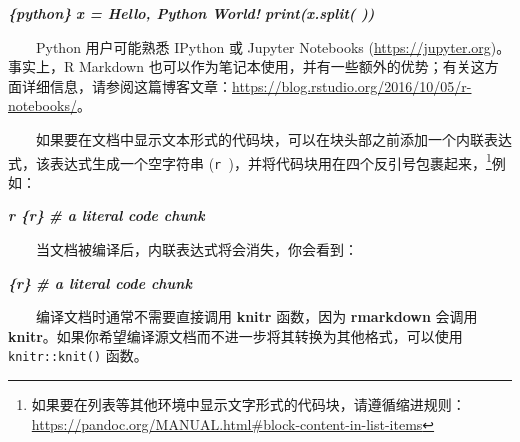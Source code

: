 \documentclass[
  12pt,
]{krantz}
\newenvironment{Shaded}{\begin{snugshade}}{\end{snugshade}}
\newcommand{\InformationTok}[1]{\textcolor[rgb]{0.56,0.35,0.01}{\textbf{\textit{#1}}}}
\theoremstyle{definition}
\theoremstyle{definition}
\theoremstyle{definition}
\theoremstyle{definition}
\theoremstyle{remark}
\begin{document}
\begin{Shaded}
\begin{Highlighting}[]
\InformationTok{\textasciigrave{}\textasciigrave{}\textasciigrave{}\{python\}}
\InformationTok{x = \textquotesingle{}Hello, Python World!\textquotesingle{}}
\InformationTok{print(x.split(\textquotesingle{} \textquotesingle{}))}
\InformationTok{\textasciigrave{}\textasciigrave{}\textasciigrave{}}
\end{Highlighting}
\end{Shaded}

  Python 用户可能熟悉 IPython 或 Jupyter Notebooks (\url{https://jupyter.org})。事实上，R Markdown 也可以作为笔记本使用，并有一些额外的优势；有关这方面详细信息，请参阅这篇博客文章：\url{https://blog.rstudio.org/2016/10/05/r-notebooks/}。

  如果要在文档中显示文本形式的代码块，可以在块头部之前添加一个内联表达式，该表达式生成一个空字符串 (\texttt{\textasciigrave{}r\ \textquotesingle{}\textquotesingle{}\textasciigrave{}})，并将代码块用在四个反引号包裹起来，\footnote{如果要在列表等其他环境中显示文字形式的代码块，请遵循缩进规则：\url{https://pandoc.org/MANUAL.html\#block-content-in-list-items}}例如：

\begin{Shaded}
\begin{Highlighting}[]
\InformationTok{\textasciigrave{}\textasciigrave{}\textasciigrave{}\textasciigrave{}}
\InformationTok{\textasciigrave{}r \textquotesingle{}\textquotesingle{}\textasciigrave{}\textasciigrave{}\textasciigrave{}\textasciigrave{}\{r\}}
\InformationTok{\# a literal code chunk}
\InformationTok{\textasciigrave{}\textasciigrave{}\textasciigrave{}}
\InformationTok{\textasciigrave{}\textasciigrave{}\textasciigrave{}\textasciigrave{}}
\end{Highlighting}
\end{Shaded}

  当文档被编译后，内联表达式将会消失，你会看到：

\begin{Shaded}
\begin{Highlighting}[]
\InformationTok{\textasciigrave{}\textasciigrave{}\textasciigrave{}\{r\}}
\InformationTok{\# a literal code chunk}
\InformationTok{\textasciigrave{}\textasciigrave{}\textasciigrave{}}
\end{Highlighting}
\end{Shaded}

  编译文档时通常不需要直接调用 \textbf{knitr} 函数，因为 \textbf{rmarkdown} 会调用 \textbf{knitr}。如果你希望编译源文档而不进一步将其转换为其他格式，可以使用 \texttt{knitr::knit()} 函数。
\end{document}
